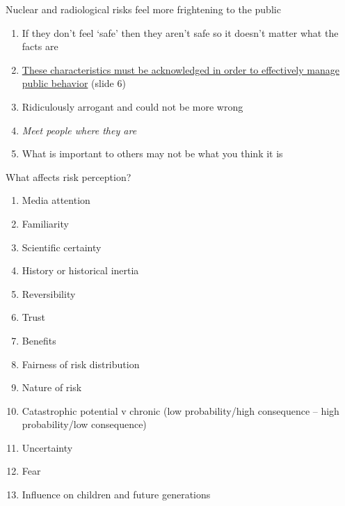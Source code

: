 \documentclass[aspectratio=1610,pdftex,dvipsnames,compress,xcolor={dvipsnames}]{beamer}
\begin{document}
\begin{frame}{Nuclear and radiological risks feel more frightening to the public}
    \begin{enumerate}[series=outerlist,topsep=0pt,itemsep=21pt,leftmargin=*,label=(\arabic*)]
        \item[]If they don't feel `safe' then they aren't safe so it doesn't matter what the facts are
        \item[]\href{https://slideplayer.com/slide/4189923/}{These characteristics must be acknowledged in order to effectively manage public behavior} (slide 6)
        \item[]Ridiculously arrogant and could not be more wrong
        \item[]\textit{Meet people where they are}
        \item[]What is important to others may not be what you think it is
    \end{enumerate}
\end{frame}


\begin{frame}{What affects risk perception?}
    \begin{enumerate}[series=outerlist,topsep=0pt,itemsep=1pt,leftmargin=*,label=(\arabic*)]
        \item[]Media attention
        \item[]Familiarity
        \item[]Scientific certainty    
        \item[]History or historical inertia
        \item[]Reversibility
        \item[]Trust
        \item[]Benefits  
        \item[]Fairness of risk distribution
        \item[]Nature of risk
        \item[]Catastrophic potential v chronic (low probability/high consequence -- high probability/low consequence) 
        \item[]Uncertainty
        \item[]Fear
        \item[]Influence on children and future generations  
    \end{enumerate}
\end{frame}
\end{document}
